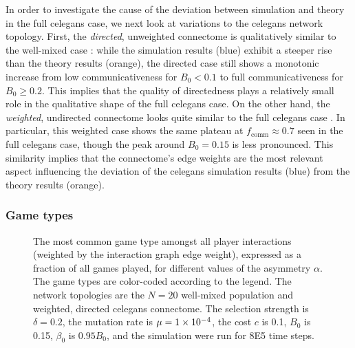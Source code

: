 \documentclass[pdflatex,lineno,referee,sn-mathphys-ay]{sn-jnl}
\begin{document}
In order to investigate the cause of the deviation
between simulation and theory
in the  full \gls{celegans} case,
we next look at variations to the \gls{celegans} network topology.
First, the 
\emph{directed}, unweighted connectome
is qualitatively similar to the
well-mixed case :
while the simulation results (blue) exhibit a steeper rise
than the theory results (orange),
the directed case still shows a monotonic increase
from low communicativeness for $B_0 < 0.1$
to full communicativeness for $B_0 \ge 0.2$.
This implies that the quality of directedness
plays a relatively small role in the qualitative shape
of the  full \gls{celegans} case.
On the other hand,
the 
\emph{weighted}, undirected connectome
looks quite similar to the 
full \gls{celegans} case .
In particular, this 
weighted case
shows the same plateau at $f_{\text{comm}} \approx 0.7$
seen in the  full \gls{celegans} case,
though the peak around $B_0 = 0.15$ is less pronounced.
This similarity implies that the connectome's edge weights
are the most relevant aspect influencing the deviation
of the  \gls{celegans}
simulation results (blue) from the theory results (orange).

\subsubsection{Game types}
\begin{figure}
  \centering
  
  \caption{
    The most common game type amongst all player interactions
    (weighted by the interaction graph edge weight),
    expressed as a fraction of all games played,
    for different values of the asymmetry $\alpha$.
    The game types are color-coded according to the legend.
    The network topologies are the
    $N=20$ well-mixed population
    and
    weighted, directed \gls{celegans} connectome.
    The selection strength is $\delta=0.2$,
    the mutation rate is $\mu=\num{1E-4}$,
    the cost $c$ is \num{0.1},
    $B_0$ is \num{0.15},
    $\beta_0$ is $\num{0.95} B_0$,
    and the simulation were run for \num{8E5} time steps.
  }
  \label{fig:game-type}
\end{figure}
\end{document}
